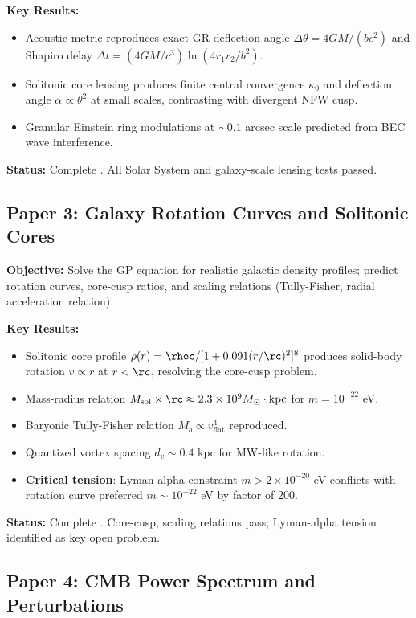 \documentclass[11pt,a4paper]{article}
\theoremstyle{definition}
\theoremstyle{remark}
\begin{document}
\textbf{Key Results:}
\begin{itemize}[leftmargin=*, itemsep=0.2em]
\item Acoustic metric reproduces exact GR deflection angle $\Delta\theta = 4GM/(bc^2)$ and Shapiro delay $\Delta t = (4GM/c^3)\ln(4r_1 r_2/b^2)$.
\item Solitonic core lensing produces finite central convergence $\kappa_0$ and deflection angle $\alpha \propto \theta^2$ at small scales, contrasting with divergent NFW cusp.
\item Granular Einstein ring modulations at $\sim 0.1$ arcsec scale predicted from BEC wave interference.
\end{itemize}

\textbf{Status:} Complete \cite{Paper2}. All Solar System and galaxy-scale lensing tests passed.

\subsection{Paper 3: Galaxy Rotation Curves and Solitonic Cores}
\label{sec:paper3}

\textbf{Objective:} Solve the GP equation for realistic galactic density profiles; predict rotation curves, core-cusp ratios, and scaling relations (Tully-Fisher, radial acceleration relation).

\textbf{Key Results:}
\begin{itemize}[leftmargin=*, itemsep=0.2em]
\item Solitonic core profile $\rho(r) = \rhoc/[1+0.091(r/\rc)^2]^8$ produces solid-body rotation $v \propto r$ at $r < \rc$, resolving the core-cusp problem.
\item Mass-radius relation $M_{\mathrm{sol}} \times \rc \approx 2.3 \times 10^9 M_\odot \cdot \mathrm{kpc}$ for $m = 10^{-22}$ eV.
\item Baryonic Tully-Fisher relation $M_b \propto v_{\mathrm{flat}}^4$ reproduced.
\item Quantized vortex spacing $d_v \sim 0.4$ kpc for MW-like rotation.
\item \textbf{Critical tension}: Lyman-alpha constraint $m > 2 \times 10^{-20}$ eV conflicts with rotation curve preferred $m \sim 10^{-22}$ eV by factor of 200.
\end{itemize}

\textbf{Status:} Complete \cite{Paper3}. Core-cusp, scaling relations pass; Lyman-alpha tension identified as key open problem.

\subsection{Paper 4: CMB Power Spectrum and Perturbations}
\label{sec:paper4}
\end{document}
